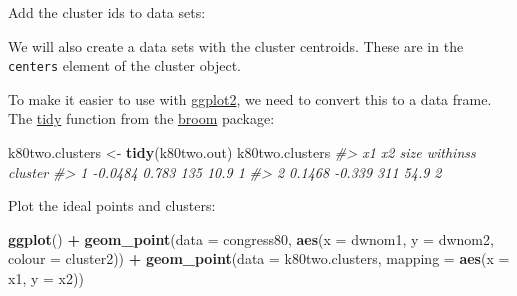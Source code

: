 \documentclass[]{book}
\newenvironment{Shaded}{\begin{snugshade}}{\end{snugshade}}
\newcommand{\KeywordTok}[1]{\textcolor[rgb]{0.13,0.29,0.53}{\textbf{#1}}}
\newcommand{\DataTypeTok}[1]{\textcolor[rgb]{0.13,0.29,0.53}{#1}}
\newcommand{\DecValTok}[1]{\textcolor[rgb]{0.00,0.00,0.81}{#1}}
\newcommand{\StringTok}[1]{\textcolor[rgb]{0.31,0.60,0.02}{#1}}
\newcommand{\CommentTok}[1]{\textcolor[rgb]{0.56,0.35,0.01}{\textit{#1}}}
\newcommand{\OperatorTok}[1]{\textcolor[rgb]{0.81,0.36,0.00}{\textbf{#1}}}
\newcommand{\NormalTok}[1]{#1}
\theoremstyle{definition}
\theoremstyle{definition}
\theoremstyle{definition}
\theoremstyle{remark}
\begin{document}
Add the cluster ids to data sets:

\begin{Shaded}
\end{Shaded}

We will also create a data sets with the cluster centroids. These are in
the \texttt{centers} element of the cluster object.

\begin{Shaded}
\end{Shaded}

To make it easier to use with
\href{https://cran.r-project.org/package=ggplot2}{ggplot2}, we need to
convert this to a data frame. The
\href{https://www.rdocumentation.org/packages/broom/topics/tidy}{tidy}
function from the \href{https://cran.r-project.org/package=broom}{broom}
package:

\begin{Shaded}
\begin{Highlighting}[]
\NormalTok{k80two.clusters <-}\StringTok{ }\KeywordTok{tidy}\NormalTok{(k80two.out)}
\NormalTok{k80two.clusters}
\CommentTok{#>        x1     x2 size withinss cluster}
\CommentTok{#> 1 -0.0484  0.783  135     10.9       1}
\CommentTok{#> 2  0.1468 -0.339  311     54.9       2}
\end{Highlighting}
\end{Shaded}

Plot the ideal points and clusters:

\begin{Shaded}
\begin{Highlighting}[]
\KeywordTok{ggplot}\NormalTok{() }\OperatorTok{+}
\StringTok{  }\KeywordTok{geom_point}\NormalTok{(}\DataTypeTok{data =}\NormalTok{ congress80,}
             \KeywordTok{aes}\NormalTok{(}\DataTypeTok{x =}\NormalTok{ dwnom1, }\DataTypeTok{y =}\NormalTok{ dwnom2, }\DataTypeTok{colour =}\NormalTok{ cluster2)) }\OperatorTok{+}
\StringTok{  }\KeywordTok{geom_point}\NormalTok{(}\DataTypeTok{data =}\NormalTok{ k80two.clusters, }\DataTypeTok{mapping =} \KeywordTok{aes}\NormalTok{(}\DataTypeTok{x =}\NormalTok{ x1, }\DataTypeTok{y =}\NormalTok{ x2))}
\end{Highlighting}
\end{Shaded}
\end{document}
